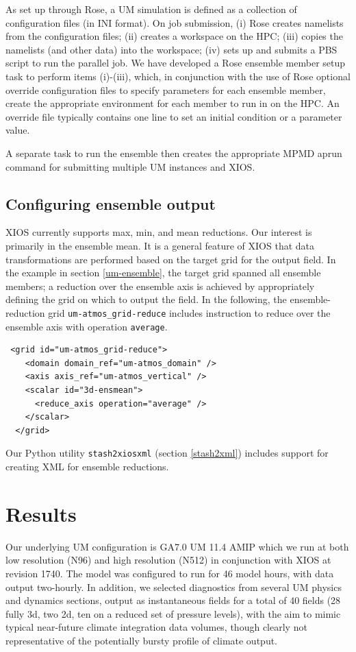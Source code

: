 \documentclass[twocolumn, 5p, times]{elsarticle}
\begin{document}
As set up through Rose, a UM simulation is defined as a collection of configuration files (in INI format). On job submission, (i) Rose creates namelists from the configuration files; (ii) creates a workspace on the HPC; (iii) copies the namelists (and other data) into the workspace; (iv) sets up and submits a PBS script to run the parallel job. We have developed a Rose ensemble member setup task to perform items (i)-(iii), which, in conjunction with the use of Rose optional override configuration files to specify parameters for each ensemble member, create the appropriate environment for each member to run in on the HPC. An override file typically contains one line to set an initial condition or a parameter value. 

A separate task to run the ensemble then creates the appropriate MPMD aprun command for submitting multiple UM instances and XIOS.


\subsection{Configuring ensemble output}

XIOS currently supports max, min, and mean reductions. Our interest is primarily in the ensemble mean. It is a general feature of XIOS that data transformations are performed based on the target grid for the output field. In the example in section \ref{um-ensemble}, the target grid spanned all ensemble members; a reduction over the ensemble axis is achieved by appropriately defining the grid on which to output the field. In the following, the ensemble-reduction grid \texttt{um-atmos\_grid-reduce} includes instruction to reduce over the ensemble axis with operation \texttt{average}.

\begin{verbatim}
 <grid id="um-atmos_grid-reduce">
    <domain domain_ref="um-atmos_domain" />
    <axis axis_ref="um-atmos_vertical" />
    <scalar id="3d-ensmean">
      <reduce_axis operation="average" />
    </scalar>
  </grid>
\end{verbatim}
Our Python utility \texttt{stash2xiosxml} (section \ref{stash2xml}) includes support for creating XML for ensemble reductions.


\section{Results}
\label{results}

Our underlying UM configuration is GA7.0 UM 11.4 AMIP \cite{Modelconfig} which we run at both low resolution (N96) and high resolution (N512) in conjunction with XIOS at revision 1740. The model was configured to run for 46 model hours, with data output two-hourly. In addition, we selected diagnostics from several UM physics and dynamics sections, output as instantaneous fields for a total of 40 fields (28 fully 3d, two 2d, ten on a reduced set of pressure levels), with the aim to mimic typical near-future climate integration data volumes, though clearly not representative of the potentially bursty profile of climate output. 
\end{document}
